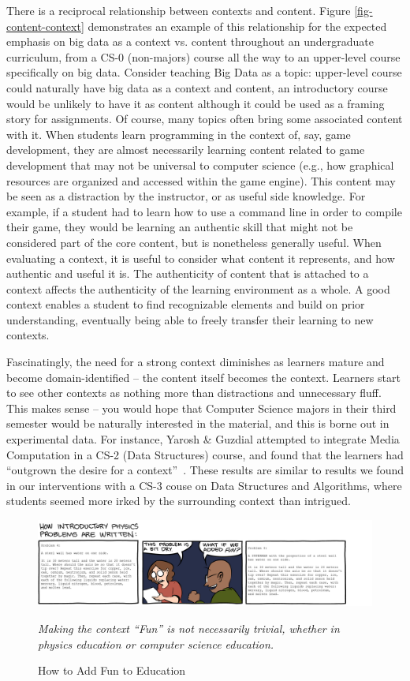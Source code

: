 There is a reciprocal relationship between contexts and content.
Figure \ref{fig-content-context} demonstrates an example of this relationship for the expected emphasis on big data as a context vs. content throughout an undergraduate curriculum, from a CS-0 (non-majors) course all the way to an upper-level course specifically on big data.
Consider teaching Big Data as a topic: upper-level course could naturally have big data as a context and content, an introductory course would be unlikely to have it as content although it could be used as a framing story for assignments.
Of course, many topics often bring some associated content with it.
When students learn programming in the context of, say, game development, they are almost necessarily learning content related to game development that may not be universal to computer science (e.g., how graphical resources are organized and accessed within the game engine).
This content may be seen as a distraction by the instructor, or as useful side knowledge. For example, if a student had to learn how to use a command line in order to compile their game, they would be learning an authentic skill that might not be considered part of the core content, but is nonetheless generally useful.
When evaluating a context, it is useful to consider what content it represents, and how authentic and useful it is.
The authenticity of content that is attached to a context affects the authenticity of the learning environment as a whole.
A good context enables a student to find recognizable elements and build on prior understanding, eventually being able to freely transfer their learning to new contexts.

Fascinatingly, the need for a strong context diminishes as learners mature and become domain-identified -- the content itself becomes the context.
Learners start to see other contexts as nothing more than distractions and unnecessary fluff.
This makes sense -- you would hope that Computer Science majors in their third semester would be naturally interested in the material, and this is borne out in experimental data.
For instance, Yarosh \& Guzdial attempted to integrate Media Computation in a CS-2 (Data Structures) course, and found that the learners had ``outgrown the desire for a context''~\cite{yarosh2008narrating}. 
These results are similar to results we found in our interventions with a CS-3 couse on Data Structures and Algorithms, where students seemed more irked by the surrounding context than intrigued.


\begin{figure}[!ht]
	\includegraphics[width=1.1\linewidth]{images/smbc-horizontal.png}
	\caption{How to Add Fun to Education}
	\textit{Making the context ``Fun'' is not necessarily trivial, whether in physics education or computer science education.~\cite{SMBC}}
	\label{fig-comic-context}
\end{figure}


